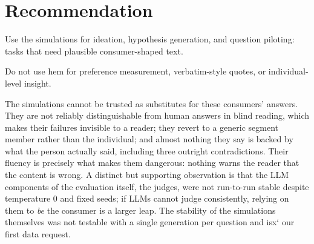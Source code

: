 \documentclass[10pt,twocolumn]{article}
\begin{document}
\section{Recommendation}
Use the simulations for ideation, hypothesis generation, and
question piloting: tasks that need plausible consumer-shaped text.

Do not use hem for preference measurement, verbatim-style
quotes, or individual-level insight.

The simulations cannot be trusted as substitutes for these consumers'
answers. They are not reliably distinguishable from human answers in blind
reading, which makes their failures invisible to a reader; they revert to
a generic segment member rather than the individual; and almost nothing
they say is backed by what the person actually said, including three
outright contradictions. Their fluency is precisely what makes them
dangerous: nothing warns the reader that the content is wrong. A distinct
but supporting observation is that the LLM components of the evaluation
itself, the judges, were not run-to-run stable despite temperature 0 and
fixed seeds; if LLMs cannot judge consistently, relying on them to
\emph{be} the consumer is a larger leap. The stability of the simulations
themselves was not testable with a single generation per question and isx`
our first data request.


{\footnotesize
}
\end{document}
